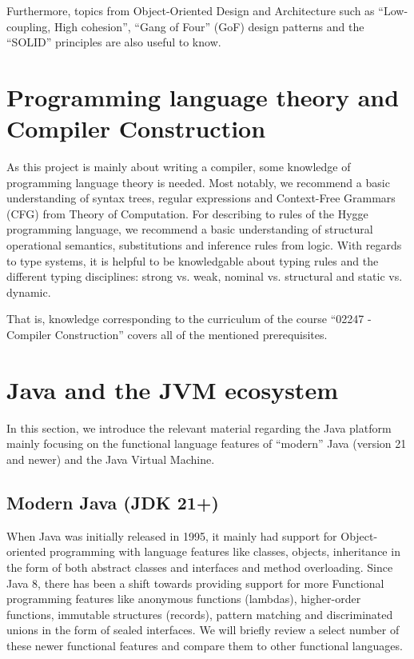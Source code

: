Furthermore, topics from Object-Oriented Design and Architecture such as ``Low-coupling, High cohesion'', ``Gang of Four'' (GoF) design patterns
and the ``SOLID'' principles are also useful to know.

\section{Programming language theory and Compiler Construction}

As this project is mainly about writing a compiler, some knowledge of programming language theory is needed.
Most notably, we recommend a basic understanding of syntax trees, regular expressions and Context-Free Grammars (CFG) from Theory of Computation.
For describing to rules of the Hygge programming language, we recommend a basic understanding of structural operational semantics, substitutions
and inference rules from logic. With regards to type systems, it is helpful to be knowledgable about typing rules and the different
typing disciplines: strong vs. weak, nominal vs. structural and static vs. dynamic.

That is, knowledge corresponding to the curriculum of the course ``02247 - Compiler Construction'' covers all of the mentioned prerequisites.

\section{Java and the JVM ecosystem}

In this section, we introduce the relevant material regarding the Java platform mainly focusing
on the functional language features of ``modern'' Java (version 21 and newer) and the Java Virtual
Machine.

\subsection{Modern Java (JDK 21+)}

When Java was initially released in 1995, it mainly had support for Object-oriented 
programming with language features like classes, objects, 
inheritance in the form of both abstract classes and interfaces and method overloading.
Since Java 8, there has been a shift towards providing support for more Functional 
programming features like anonymous functions (lambdas), higher-order functions, immutable
structures (records), pattern matching and discriminated unions in the form of sealed 
interfaces. We will briefly review a select number of these newer functional features
and compare them to other functional languages.


